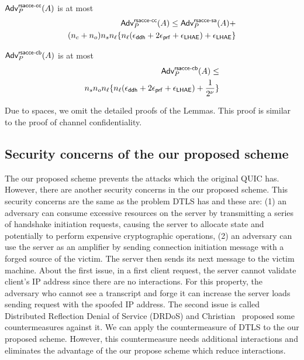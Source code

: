 \begin{lemma} \label{lemma:proposed_scheme_rsacce-cc}
 $\mathsf{Adv}^{\mathsf{rsacce\textsc{-} cc}}_{P}(A)$ is at most
 \begin{eqnarray}
  \mathsf{Adv}^{\mathsf{rsacce\textsc{-} cc}}_{P}(A) \leq \mathsf{Adv}^{\mathsf{rsacce\textsc{-} sa}}_{P}(A) + \nonumber \\
  (n_c + n_o) n_s n_{\ell} \{ n_{\ell}(\epsilon_{\mathsf{ddh}} + 2\epsilon_{\mathsf{prf}} + \epsilon_{\mathsf{LHAE}})
  + \epsilon_{\mathsf{LHAE}} \}
 \end{eqnarray}
\end{lemma}
%


\begin{lemma} \label{lemma:proposed_scheme_rsacce-cb}
 $\mathsf{Adv}^{\mathsf{rsacce\textsc{-} cb}}_{P}(A)$ is at most
 \begin{eqnarray}
  \mathsf{Adv}^{\mathsf{rsacce\textsc{-} cb}}_{P}(A) \leq \nonumber \\
  n_s n_o n_{\ell} \{ n_{\ell}(\epsilon_{\mathsf{ddh}} + 2\epsilon_{\mathsf{prf}} + \epsilon_{\mathsf{LHAE}}) + \frac{1}{2^{\nu}} \}
 \end{eqnarray}
\end{lemma}
%
Due to spaces, we omit the detailed proofs of the Lemmas.
This proof is similar to the proof of channel confidentiality.

\subsection{Security concerns of the our proposed scheme} \label{sec:prop_sec_concerns}

The our proposed scheme prevents the attacks which the original QUIC has.
However, there are another security concerns in the our proposed scheme.
This security concerns are the same as the problem DTLS\cite{DTLS12}
has and these are: (1) an adversary can consume excessive resources
on the server by transmitting a series of handshake initiation requests,
causing the server to allocate state and potentially to perform expensive
cryptographic operations, (2) an adversary can use the server as an
amplifier by sending connection initiation message with a forged source
of the victim. The server then sends its next message to the victim
machine.
About the first issue, in a first client request, the server cannot validate
client's IP address since there are no interactions.
For this property, the adversary who cannot see a
transcript and forge it can increase the server loads sending request
with the spoofed IP address.
The second issue is called Distributed Reflection Denial of Service
(DRDoS) and Christian~\cite{Ross14} proposed some countermeasures against it.
We can apply the countermeasure of DTLS to the our proposed scheme.
However, this countermeasure needs additional interactions and eliminates
the advantage of the our propose scheme which reduce interactions.

